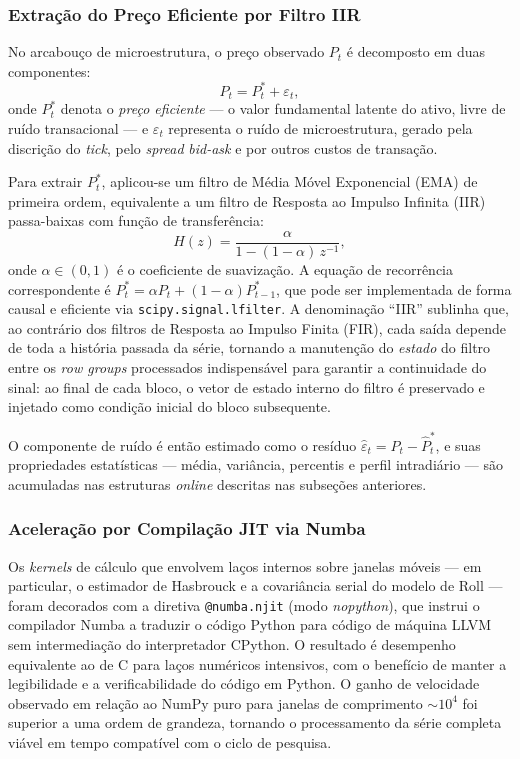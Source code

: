 \subsubsection{Extração do Preço Eficiente por Filtro IIR}
\label{subsubsec:filtro_iir}

No arcabouço de microestrutura, o preço observado $P_t$ é decomposto em duas componentes:
%
\begin{equation}
    \label{eq:price_decomp}
    P_t = P_t^* + \varepsilon_t,
\end{equation}
%
onde $P_t^*$ denota o \emph{preço eficiente} --- o valor fundamental latente do ativo, livre de ruído transacional --- e $\varepsilon_t$ representa o ruído de microestrutura, gerado pela discrição do \emph{tick}, pelo \emph{spread} \emph{bid-ask} e por outros custos de transação.

Para extrair $P_t^*$, aplicou-se um filtro de Média Móvel Exponencial (EMA) de primeira ordem, equivalente a um filtro de Resposta ao Impulso Infinita (IIR) passa-baixas com função de transferência:
%
\begin{equation}
    \label{eq:iir}
    H(z) = \frac{\alpha}{1 - (1-\alpha)\,z^{-1}},
\end{equation}
%
onde $\alpha \in (0,1)$ é o coeficiente de suavização. A equação de recorrência correspondente é $P_t^* = \alpha P_t + (1-\alpha)P_{t-1}^*$, que pode ser implementada de forma causal e eficiente via \texttt{scipy.signal.lfilter}. A denominação ``IIR'' sublinha que, ao contrário dos filtros de Resposta ao Impulso Finita (FIR), cada saída depende de toda a história passada da série, tornando a manutenção do \emph{estado} do filtro entre os \emph{row groups} processados indispensável para garantir a continuidade do sinal: ao final de cada bloco, o vetor de estado interno do filtro é preservado e injetado como condição inicial do bloco subsequente.

O componente de ruído é então estimado como o resíduo $\hat{\varepsilon}_t = P_t - \hat{P}_t^*$, e suas propriedades estatísticas --- média, variância, percentis e perfil intradiário --- são acumuladas nas estruturas \emph{online} descritas nas subseções anteriores.

\subsubsection{Aceleração por Compilação JIT via Numba}
\label{subsubsec:numba}

Os \emph{kernels} de cálculo que envolvem laços internos sobre janelas móveis --- em particular, o estimador de Hasbrouck e a covariância serial do modelo de Roll --- foram decorados com a diretiva \texttt{@numba.njit} (modo \emph{nopython}), que instrui o compilador Numba a traduzir o código Python para código de máquina LLVM sem intermediação do interpretador CPython. O resultado é desempenho equivalente ao de C para laços numéricos intensivos, com o benefício de manter a legibilidade e a verificabilidade do código em Python. O ganho de velocidade observado em relação ao NumPy puro para janelas de comprimento $\sim$$10^4$ foi superior a uma ordem de grandeza, tornando o processamento da série completa viável em tempo compatível com o ciclo de pesquisa.

